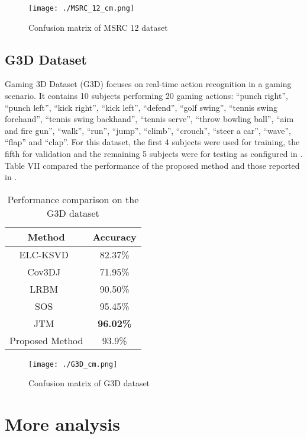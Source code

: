 \documentclass[10pt,journal]{IEEEtran}
\begin{document}
\begin{figure}[htb]
\centering
\texttt{[image: ./MSRC\_12\_cm.png]}
\caption{Confusion matrix of MSRC 12 dataset}
\label{fig:map}
\end{figure}

\subsection{G3D Dataset}
Gaming 3D Dataset (G3D)\cite{Bloom2012G3D} focuses on real-time action recognition in a gaming scenario. It contains 10 subjects performing 20 gaming actions: “punch right”, “punch left”, “kick right”, “kick left”, “defend”, “golf swing”, “tennis swing forehand”, “tennis swing backhand”, “tennis serve”, “throw bowling ball”, “aim and fire gun”, “walk”, “run”, “jump”, “climb”, “crouch”, “steer a car”, “wave”, “flap” and “clap”. For this dataset, the first 4 subjects were used for training, the fifth for validation and the remaining 5 subjects were for testing as configured in \cite{Nie2015A}. Table VII compared the performance of the proposed method and those reported in \cite{Nie2015A}.


\begin{table}[htb]
\begin{center}
\caption{Performance comparison on the G3D dataset \cite{Shahroudy2016NTU}} \label{tab:G3D}
\begin{tabular}{  c  c }
\hline
Method              &Accuracy \\
\hline
ELC-KSVD~\cite{Zhou2014Discriminative} &82.37\%\\
Cov3DJ~\cite{Hussein2013Human}  &71.95\%\\
LRBM~\cite{Nie2015A} & 90.50\%\\
SOS~\cite{Hou2016Skeleton}  &95.45\%\\
JTM~\cite{Wang2016Action}& \bf{96.02}\%\\
Proposed Method     & {93.9\%}\\
\hline
\end{tabular}
\end{center}
\end{table}

\begin{figure}[htb]
\centering
\texttt{[image: ./G3D\_cm.png]}
\caption{Confusion matrix of G3D dataset}
\label{fig:map}
\end{figure}




\section{More analysis}
\label{analysis}
\end{document}
